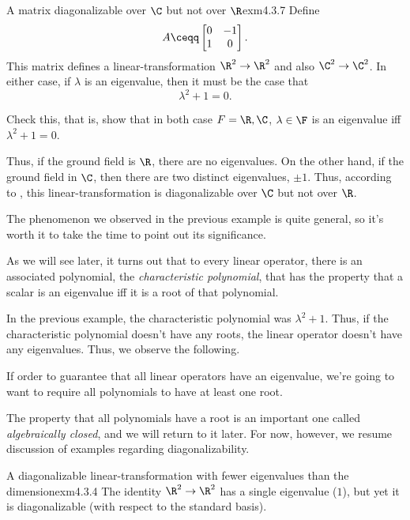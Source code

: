 \begin{exm}{A matrix diagonalizable over $\C$ but not over $\R$}{exm4.3.7}
	Define
	\begin{equation}
		A\ceqq \begin{bmatrix}0 & -1 \\ 1 & 0\end{bmatrix}.
	\end{equation}
	This matrix defines a linear-transformation $\R ^2\rightarrow \R ^2$ and also $\C ^2\rightarrow \C ^2$.  In either case, if $\lambda$ is an eigenvalue, then it must be the case that
	\begin{equation}
		\lambda ^2+1=0.
	\end{equation}
	\begin{exr}[breakable=false]{}{}
		Check this, that is, show that in both case $F=\R ,\C$, $\lambda \in \F$ is an eigenvalue iff $\lambda ^2+1=0$.
	\end{exr}

	Thus, if the ground field is $\R$, there are no eigenvalues.  On the other hand, if the ground field in $\C$, then there are two distinct eigenvalues, $\pm 1$.  Thus, according to , this linear-transformation is diagonalizable over $\C$ but not over $\R$.
\end{exm}
The phenomenon we observed in the previous example is quite general, so it's worth it to take the time to point out its significance.
\begin{important}
	As we will see later, it turns out that to every linear operator, there is an associated polynomial, the \emph{characteristic polynomial}, that has the property that a scalar is an eigenvalue iff it is a root of that polynomial. 
\end{important}
In the previous example, the characteristic polynomial was $\lambda ^2+1$.  Thus, if the characteristic polynomial doesn't have any roots, the linear operator doesn't have any eigenvalues.  Thus, we observe the following.
\begin{important}
	If order to guarantee that all linear operators have an eigenvalue, we're going to want to require all polynomials to have at least one root.
\end{important}
The property that all polynomials have a root is an important one called \emph{algebraically closed}, and we will return to it later.  For now, however, we resume discussion of examples regarding diagonalizability.
\begin{exm}{A diagonalizable linear-transform\-ation with fewer eigenvalues than the dimension}{exm4.3.4}
	The identity $\R ^2\rightarrow \R ^2$ has a single eigenvalue ($1$), but yet it is diagonalizable (with respect to the standard basis).
\end{exm}
